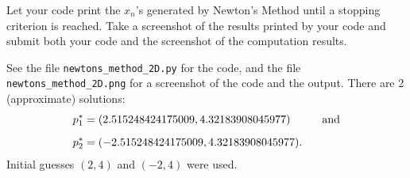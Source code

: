 \documentclass[11pt,oneside,english,reqno]{amsart}
\theoremstyle{definition}
\newcommand{\pspace}{\hspace{10mm}}
\newcommand{\1}{\mathbbm{1}}
\begin{document}
\begin{enumerate}[leftmargin=*]
Let your code print the $x_n$'s generated by Newton's Method until a stopping criterion is reached. Take a screenshot of the results printed by your code and submit both your code and the screenshot of the computation results.

See the file \verb!newtons_method_2D.py! for the code, and the file \verb!newtons_method_2D.png! for a screenshot of the code and the output. There are 2 (approximate) solutions:
\begin{align*}
p_1^* &= (2.515248424175009, 4.32183908045977) \pspace \text{and}\\[2mm]
p_2^*&=(-2.515248424175009, 4.32183908045977).
\end{align*}
Initial guesses $(2,4)$ and $(-2,4)$ were used.


\end{enumerate}
\end{document}
